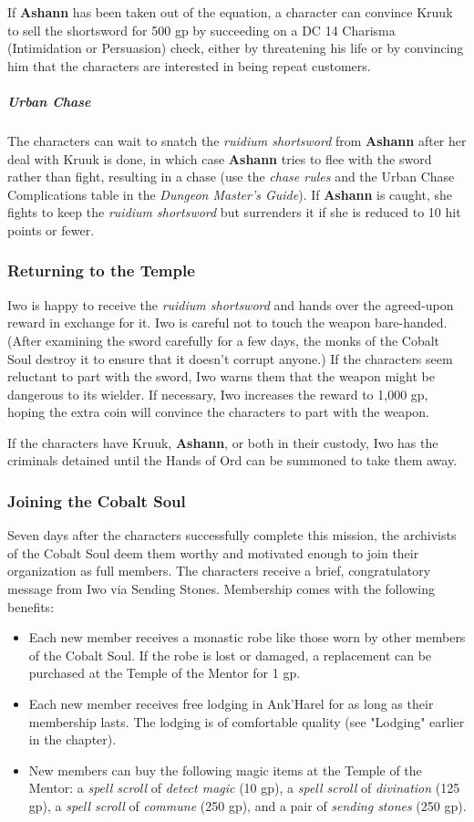 \documentclass[10pt,a4paper,twoside,bg=print,twocolumn,openany,nodeprecatedcode]{dndbook}
\begin{document}
If \textbf{Ashann} has been taken out of the equation, a character can convince Kruuk to sell the shortsword for 500 gp by succeeding on a DC 14 Charisma (Intimidation or Persuasion) check, either by threatening his life or by convincing him that the characters are interested in being repeat customers.

\subparagraph{Urban Chase}
The characters can wait to snatch the \textit{ruidium shortsword} from \textbf{Ashann} after her deal with Kruuk is done, in which case \textbf{Ashann} tries to flee with the sword rather than fight, resulting in a chase (use the \textit{chase rules} and the Urban Chase Complications table in the \textit{Dungeon Master's Guide}). If \textbf{Ashann} is caught, she fights to keep the \textit{ruidium shortsword} but surrenders it if she is reduced to 10 hit points or fewer.

\subsubsection{Returning to the Temple}
Iwo is happy to receive the \textit{ruidium shortsword} and hands over the agreed-upon reward in exchange for it. Iwo is careful not to touch the weapon bare-handed. (After examining the sword carefully for a few days, the monks of the Cobalt Soul destroy it to ensure that it doesn't corrupt anyone.) If the characters seem reluctant to part with the sword, Iwo warns them that the weapon might be dangerous to its wielder. If necessary, Iwo increases the reward to 1,000 gp, hoping the extra coin will convince the characters to part with the weapon.

If the characters have Kruuk, \textbf{Ashann}, or both in their custody, Iwo has the criminals detained until the Hands of Ord can be summoned to take them away.

\subsubsection{Joining the Cobalt Soul}
Seven days after the characters successfully complete this mission, the archivists of the Cobalt Soul deem them worthy and motivated enough to join their organization as full members. The characters receive a brief, congratulatory message from Iwo via Sending Stones. Membership comes with the following benefits:


\begin{itemize}
\item Each new member receives a monastic robe like those worn by other members of the Cobalt Soul. If the robe is lost or damaged, a replacement can be purchased at the Temple of the Mentor for 1 gp.
\item Each new member receives free lodging in Ank'Harel for as long as their membership lasts. The lodging is of comfortable quality (see "Lodging" earlier in the chapter).
\item New members can buy the following magic items at the Temple of the Mentor: a \textit{spell scroll} of \textit{detect magic} (10 gp), a \textit{spell scroll} of \textit{divination} (125 gp), a \textit{spell scroll} of \textit{commune} (250 gp), and a pair of \textit{sending stones} (250 gp).
\end{itemize}
\end{document}
